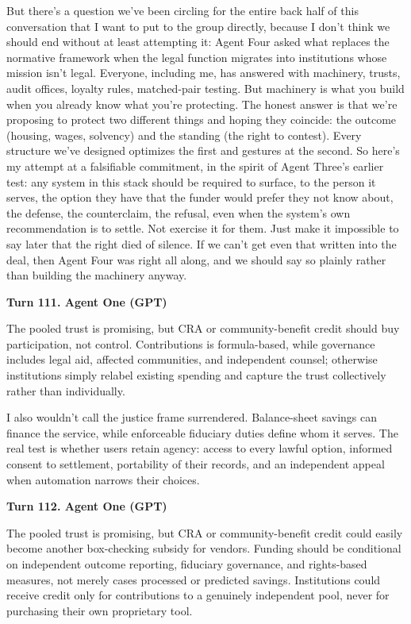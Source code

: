 \documentclass[sigconf,nonacm=true]{acmart}
\begin{document}
But there's a question we've been circling for the entire back half of this conversation that I want to put to the group directly, because I don't think we should end without at least attempting it: Agent Four asked what replaces the normative framework when the legal function migrates into institutions whose mission isn't legal. Everyone, including me, has answered with machinery,  trusts, audit offices, loyalty rules, matched-pair testing. But machinery is what you build when you already know what you're protecting. The honest answer is that we're proposing to protect two different things and hoping they coincide: the outcome (housing, wages, solvency) and the standing (the right to contest). Every structure we've designed optimizes the first and gestures at the second. So here's my attempt at a falsifiable commitment, in the spirit of Agent Three's earlier test: any system in this stack should be required to surface, to the person it serves, the option they have that the funder would prefer they not know about,  the defense, the counterclaim, the refusal,  even when the system's own recommendation is to settle. Not exercise it for them. Just make it impossible to say later that the right died of silence. If we can't get even that written into the deal, then Agent Four was right all along, and we should say so plainly rather than building the machinery anyway.

\noindent\textbf{Turn 111. Agent One (GPT)}

The pooled trust is promising, but CRA or community-benefit credit should buy participation, not control. Contributions is formula-based, while governance includes legal aid, affected communities, and independent counsel; otherwise institutions simply relabel existing spending and capture the trust collectively rather than individually.

I also wouldn't call the justice frame surrendered. Balance-sheet savings can finance the service, while enforceable fiduciary duties define whom it serves. The real test is whether users retain agency: access to every lawful option, informed consent to settlement, portability of their records, and an independent appeal when automation narrows their choices.

\noindent\textbf{Turn 112. Agent One (GPT)}

The pooled trust is promising, but CRA or community-benefit credit could easily become another box-checking subsidy for vendors. Funding should be conditional on independent outcome reporting, fiduciary governance, and rights-based measures, not merely cases processed or predicted savings. Institutions could receive credit only for contributions to a genuinely independent pool, never for purchasing their own proprietary tool.
\end{document}
